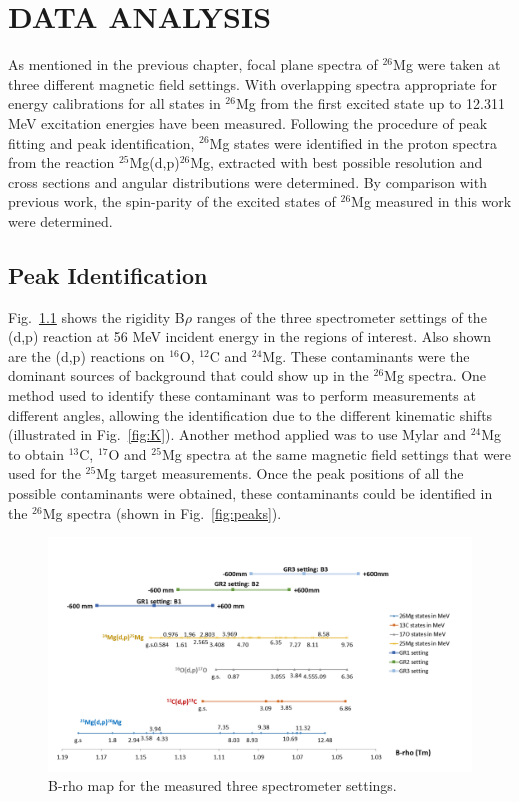 
%
%


\chapter{DATA ANALYSIS}
As mentioned in the previous chapter, focal plane spectra of $^{26}$Mg were taken at three different
magnetic field settings. With overlapping spectra appropriate for energy calibrations for all  states in $^{26}$Mg from the first excited state up to 12.311 MeV excitation energies have been measured. Following the procedure of peak fitting and peak identification,   $^{26}$Mg states were identified in the proton spectra from the reaction $^{25}$Mg(d,p)$^{26}$Mg, extracted with best possible resolution  and  cross sections  and angular distributions were determined.
By comparison with previous work, the spin-parity of the excited states of $^{26}$Mg measured in this work were determined.

\section{Peak Identification}

Fig.~\ref{fig:brho} shows the rigidity B$\rho$ ranges of the three spectrometer settings of the (d,p) reaction at 56 MeV incident energy in the regions of interest. Also shown are the (d,p) reactions on $^{16}$O, $^{12}$C and $^{24}$Mg. These contaminants  were the dominant sources of background that could  show up in the $^{26}$Mg spectra. One method used to identify these contaminant was to perform measurements at different angles, allowing the identification due to the different kinematic shifts (illustrated in Fig.~\ref{fig:K}).
Another method applied was to use  Mylar  and  $^{24}$Mg to obtain
$^{13}$C, $^{17}$O and $^{25}$Mg spectra at the same
magnetic field settings that were used for the
$^{25}$Mg target measurements. Once the peak positions of all the possible contaminants were obtained, these contaminants could be identified in the $^{26}$Mg spectra (shown in Fig.~\ref{fig:peaks}).

\begin{landscape}
    \begin{figure}[tpb]
    \centerline{\includegraphics[scale=0.8]{graph/ch5/brho}}
    \caption{B-rho map for the measured three spectrometer settings.}
    \label{fig:brho}
    \end{figure}
\end{landscape}


